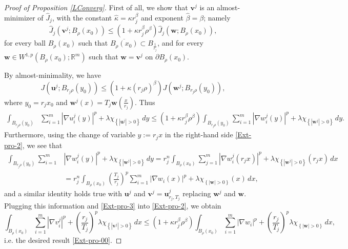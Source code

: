 \documentclass{amsart}
\begin{document}
\begin{proof}[Proof of Proposition \ref{LConverg}] 
First of all, we show that $\mathbf{v}^j$ is an almost-minimizer of $\hat{J}_j$, with the constant $\hat{\kappa}=\kappa r_j^{\beta}$ and exponent $\hat{\beta}=\beta$; namely
\begin{equation}
\label{Ext-pro-00}
\hat{J}_j \left(\mathbf{v}^j; B_{\rho}(x_0) \right) \leq \left(1+\kappa r_j^{\beta} \rho^{\beta} \right) \hat{J}_j(\mathbf{w}; B_{\rho}(x_0)), 
\end{equation}
for every ball $ B_{\rho}(x_0)$ such that $ \overline{B_{\rho}(x_0)} \subset B_{\frac{1}{r_j}}$, and for every $\mathbf{w} \in W^{1,p}(B_{\rho}(x_0); \mathbb{R}^m)$ such that $\mathbf{w} = \mathbf{v}^j$ on $\partial B_{\rho}(x_0)$.

By almost-minimality,   we have 
$$ J \left(\mathbf{u}^j; B_{r_j\rho}(y_0) \right) \leq \left(1+\kappa (r_j\rho)^{\beta} \right) J \left(\mathbf{w}^j; B_{r_j\rho}(y_0)\right), 
$$
where $y_0=r_j x_0$ and $\mathbf{w}^j(x)=T_j \mathbf{w} (\frac{x}{r_j} )$. Thus
\begin{align} \label{Ext-pro-2}
\int_{B_{r_j\rho}(y_0)} &\sum_{i=1}^{m} \left|\nabla u_i^j(y) \right|^p + \lambda \chi_{\left\{\left|\mathbf{u}^j \right|>0 \right\}} \, dy  
 \leq \left(1+\kappa r_j^{\beta} \rho^{\beta}\right) \int_{B_{r_j \rho}(y_0)} \sum_{i=1}^{m} \left|\nabla w^j_i(y) \right|^p + \lambda \chi_{\left\{ \left|\mathbf{w}^j \right|>0 \right\}} \, dy.
\end{align}
Furthermore, using
the change of variable $y := {r_j}x$ in the right-hand side \eqref{Ext-pro-2}, we see that
\begin{align} \nonumber
\int_{B_{r_j\rho}(y_0)} \sum_{i=1}^{m} &  \left|\nabla w^j_i(y) \right|^p + \lambda \chi_{\left\{\left|\mathbf{w}^j \right|>0 \right\}} \, dy = r_j^n \int_{B_{\rho}(x_0)} \sum_{j=1}^{m} \left|\nabla w_i^j(r_jx) \right|^p + \lambda \chi_{\left\{ \left|\mathbf{w}^j \right|>0 \right\}}(r_jx) \, dx \\ \label{Ext-pro-3}
& = r_j^n \int_{B_{\rho}(x_0)} \left(  \frac{T_j}{r_j} \right)^p \sum_{i=1}^{m} \left|\nabla {w_i}(x) \right|^p + \lambda \chi_{\left\{\left|{\mathbf{w}}\right|>0\right\} }(x) \, dx,
\end{align}
and a similar identity holds true with $\mathbf{u}^j$ and $\mathbf{v}^j={\mathbf{u}}^j_{r_j,T_j}$
replacing $\mathbf{w}^j$ and ${\mathbf{w}}$. 
Plugging this information and \eqref{Ext-pro-3} into \eqref{Ext-pro-2}, we obtain 
$$ \int_{B_{\rho}(x_0)} \sum_{i=1}^{m} \left|\nabla v_i^j \right|^p + \left(  \frac{r_j}{T_j} \right)^p\lambda \chi_{\left\{\left|\mathbf{v}^j \right|>0 \right\}} \, dx \leq \left(1+\kappa r_j^{\beta} \rho^{\beta} \right) \int_{B_{\rho}(x_0)} \sum_{i=1}^{m} |\nabla w_i|^p + \left(  \frac{r_j}{T_j} \right)^p \lambda \chi_{\left\{|\mathbf{w}|>0 \right\}} \, dx, $$
i.e. the desired result \eqref{Ext-pro-00}.


\end{proof}
\end{document}

